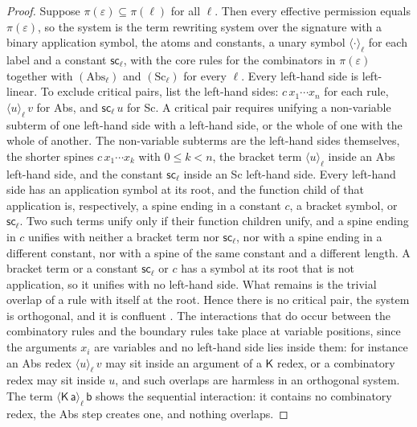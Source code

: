 \documentclass[11pt]{article}
\theoremstyle{definition}
\theoremstyle{remark}
\newcommand{\cK}{\mathsf{K}}
\newcommand{\br}[2]{\langle #1\rangle_{#2}}
\newcommand{\sca}[1]{\mathsf{sc}_{#1}}
\begin{document}
\begin{proof}
Suppose $\pi(\varepsilon)\subseteq\pi(\ell)$ for all $\ell$. Then every effective permission equals $\pi(\varepsilon)$, so the system is the term rewriting system over the signature with a binary application symbol, the atoms and constants, a unary symbol $\langle\cdot\rangle_\ell$ for each label and a constant $\sca\ell$, with the core rules for the combinators in $\pi(\varepsilon)$ together with $(\mathrm{Abs}_\ell)$ and $(\mathrm{Sc}_\ell)$ for every $\ell$. Every left-hand side is left-linear. To exclude critical pairs, list the left-hand sides: $c\,x_1\cdots x_n$ for each rule, $\br u\ell\,v$ for Abs, and $\sca\ell\,u$ for Sc. A critical pair requires unifying a non-variable subterm of one left-hand side with a left-hand side, or the whole of one with the whole of another. The non-variable subterms are the left-hand sides themselves, the shorter spines $c\,x_1\cdots x_k$ with $0\le k<n$, the bracket term $\br u\ell$ inside an Abs left-hand side, and the constant $\sca\ell$ inside an Sc left-hand side. Every left-hand side has an application symbol at its root, and the function child of that application is, respectively, a spine ending in a constant $c$, a bracket symbol, or $\sca\ell$. Two such terms unify only if their function children unify, and a spine ending in $c$ unifies with neither a bracket term nor $\sca\ell$, nor with a spine ending in a different constant, nor with a spine of the same constant and a different length. A bracket term or a constant $\sca\ell$ or $c$ has a symbol at its root that is not application, so it unifies with no left-hand side. What remains is the trivial overlap of a rule with itself at the root. Hence there is no critical pair, the system is orthogonal, and it is confluent \citep[Ch.~4]{terese2003}. The interactions that do occur between the combinatory rules and the boundary rules take place at variable positions, since the arguments $x_i$ are variables and no left-hand side lies inside them: for instance an Abs redex $\br u\ell\,v$ may sit inside an argument of a $\cK$ redex, or a combinatory redex may sit inside $u$, and such overlaps are harmless in an orthogonal system. The term $\br{\cK\,\mathsf a}\ell\,\mathsf b$ shows the sequential interaction: it contains no combinatory redex, the Abs step creates one, and nothing overlaps.


\end{proof}
\end{document}
